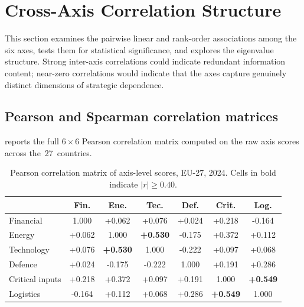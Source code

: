 \section{Cross-Axis Correlation Structure}\label{sec:cross-axis}

This section examines the pairwise linear and rank-order associations
among the six axes, tests them for statistical significance, and
explores the eigenvalue structure.  Strong inter-axis correlations
could indicate redundant information content; near-zero correlations
would indicate that the axes capture genuinely distinct dimensions of
strategic dependence.

\subsection{Pearson and Spearman correlation matrices}

 reports the full $6 \times 6$ Pearson
correlation matrix computed on the raw axis scores across
the~27~countries.

\begin{table}[htbp]
\centering
\caption{Pearson correlation matrix of axis-level scores, EU-27,
  2024.  Cells in bold indicate $|r| \geq 0.40$.}
\label{tab:corr-pearson}
\small
\setlength{\tabcolsep}{4pt}
\begin{tabular*}{\textwidth}{@{\extracolsep{\fill}} l S S S S S S @{}}
\toprule
 & {\textbf{Fin.}} & {\textbf{Ene.}} & {\textbf{Tec.}}
 & {\textbf{Def.}} & {\textbf{Crit.}} & {\textbf{Log.}} \\
\midrule
Financial       & {1.000} & +0.062 & +0.076 & +0.024 & +0.218 & -0.164 \\
Energy          & +0.062 & {1.000} & \textbf{+0.530} & -0.175 & +0.372 & +0.112 \\
Technology      & +0.076 & \textbf{+0.530} & {1.000} & -0.222 & +0.097 & +0.068 \\
Defence         & +0.024 & -0.175 & -0.222 & {1.000} & +0.191 & +0.286 \\
Critical inputs & +0.218 & +0.372 & +0.097 & +0.191 & {1.000} & \textbf{+0.549} \\
Logistics       & -0.164 & +0.112 & +0.068 & +0.286 & \textbf{+0.549} & {1.000} \\
\bottomrule
\end{tabular*}
\end{table}

